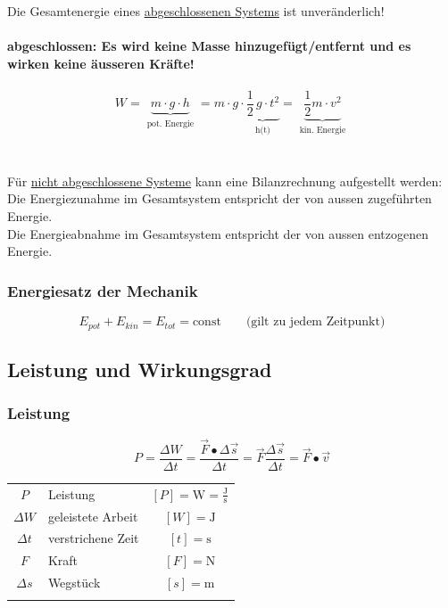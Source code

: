 		Die Gesamtenergie eines \underline{abgeschlossenen Systems} ist unveränderlich! \\
		\\
		\textbf{abgeschlossen: Es wird keine Masse hinzugefügt/entfernt und es wirken keine äusseren Kräfte!} \\
			\\	
			$$ \boxed{ W = \underbrace{m \cdot g \cdot h}_{\substack{\text{pot. Energie}}} =  m \cdot g \cdot \underbrace{ \frac{1}{2} \, g \cdot t^2}_{\substack{\text{h(t)}}}  = \underbrace{ \frac{1}{2} m \cdot v^2 }_{\substack{\text{kin. Energie}}} } $$ \\
			\\
			Für \underline{nicht abgeschlossene Systeme} kann eine Bilanzrechnung aufgestellt werden: \\
			Die Energiezunahme im Gesamtsystem entspricht der von aussen zugeführten Energie. \\
			Die Energieabnahme im Gesamtsystem entspricht der von aussen entzogenen Energie. \\

		\subsubsection{Energiesatz der Mechanik} 
			$$ \boxed{ E_{pot} + E_{kin} = E_{tot} = \text{const} } \qquad \text{(gilt zu jedem Zeitpunkt)} $$

	\subsection{Leistung und Wirkungsgrad}
	
		\subsubsection{Leistung}
		
			$$ \boxed{ P = \frac{\Delta W}{\Delta t} = \frac{\vec{F} \bullet \Delta \vec{s}}{\Delta t} = \vec{F} \frac{\Delta \vec{s}}{\Delta t} = \vec{F} \bullet \vec{v} } $$ 
			
			
			\begin{tabular}{c l c}
				$P$ & Leistung & $[P] = \mathrm{W = \frac{J}{s}}$ \\
				$\Delta W$ & geleistete Arbeit & $[W] = \mathrm{J}$ \\
				$\Delta t$ & verstrichene Zeit & $[t] = \mathrm{s}$ \\
				$F$ & Kraft & $[F] = \mathrm{N}$ \\
				$\Delta s$ & Wegstück & $[s] = \mathrm{m}$ \\
				\\
			\end{tabular}
			
